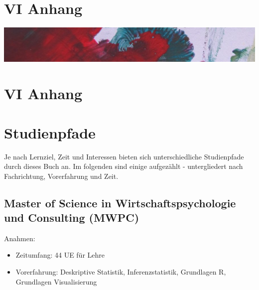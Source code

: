 \documentclass[12pt,ngerman,]{book}
\begin{document}
\chapter*{VI Anhang}\label{vi-anhang}

\includegraphics[width=1\linewidth]{images/farb1}

\chapter*{VI Anhang}\label{vi-anhang-1}

\chapter{Studienpfade}\label{studienpfade}

Je nach Lernziel, Zeit und Interessen bieten sich unterschiedliche
Studienpfade durch dieses Buch an. Im folgenden sind einige aufgezählt -
untergliedert nach Fachrichtung, Vorerfahrung und Zeit.

\section{Master of Science in Wirtschaftspsychologie und Consulting
(MWPC)}\label{master-of-science-in-wirtschaftspsychologie-und-consulting-mwpc}

Anahmen:

\begin{itemize}
\item
  Zeitumfang: 44 UE für Lehre
\item
  Vorerfahrung: Deskriptive Statistik, Inferenzstatistik, Grundlagen R,
  Grundlagen Visualisierung
\end{itemize}
\end{document}
